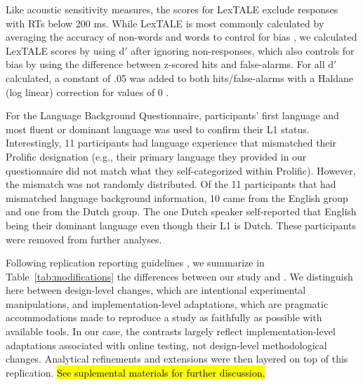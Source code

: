Like acoustic sensitivity measures, the scores for LexTALE exclude responses with RTs below 200 ms. While LexTALE is most commonly calculated by averaging the accuracy of non-words and words to control for bias \parencite{lemhofer2012introducing}, we calculated LexTALE scores by using d$'$ after ignoring non-responses, which also controls for bias by using the difference between z-scored hits and false-alarms. For all d$'$ calculated, a constant of .05 was added to both hits/false-alarms with a Haldane (log linear) correction for values of 0 \parencite{Hautus1995}. 

For the Language Background Questionnaire, participants' first language and most fluent or dominant language was used to confirm their L1 status. Interestingly, 11 participants had language experience that mismatched their Prolific designation (e.g., their primary language they provided in our questionnaire did not match what they self-categorized within Prolific). However, the mismatch was not randomly distributed. Of the 11 participants that had mismatched language background information, 10 came from the English group and one from the Dutch group. The one Dutch speaker self-reported that English being their dominant language even though their L1 is Dutch. These participants were removed from further analyses.

Following replication reporting guidelines \parencite{mcmanus2024,mcmanus2024replication2}, we
summarize in Table~\ref{tab:modifications} the differences between our study and \textcite{ge2021a}. We distinguish here between design-level changes, which are intentional experimental manipulations, and implementation-level adaptations, which are pragmatic accommodations made to reproduce a study as faithfully as possible with available tools. In our case, the contrasts largely reflect implementation-level adaptations associated with online testing, not design-level methodological changes. Analytical refinements and extensions were then layered on top of this replication. \hl{See suplemental materials for further discussion.}

